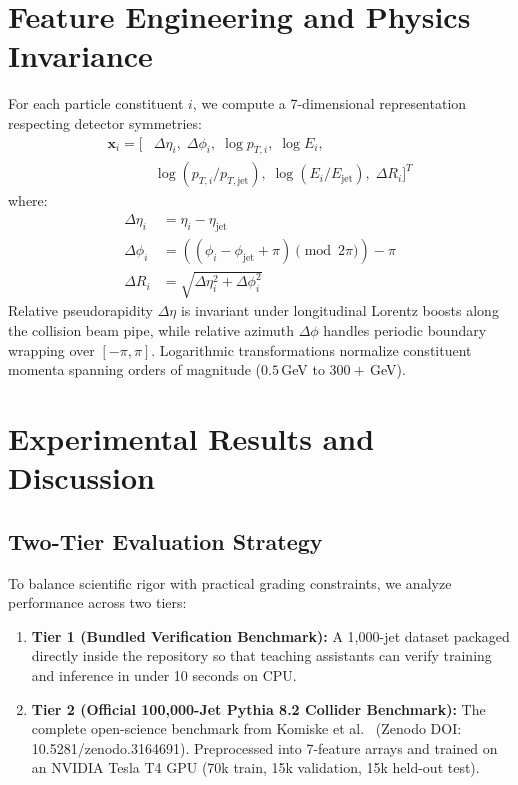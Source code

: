 \documentclass[10pt,twocolumn,letterpaper]{article}
\begin{document}
\section{Feature Engineering and Physics Invariance}
For each particle constituent $i$, we compute a 7-dimensional representation respecting detector symmetries:
\begin{align}
    \mathbf{x}_i = \big[ &\Delta \eta_i, \; \Delta \phi_i, \; \log p_{T, i}, \; \log E_i, \nonumber\\
    &\log(p_{T, i}/p_{T, \text{jet}}), \; \log(E_i/E_{\text{jet}}), \; \Delta R_i \big]^T
\end{align}
where:
\begin{align}
    \Delta \eta_i &= \eta_i - \eta_{\text{jet}} \\
    \Delta \phi_i &= ((\phi_i - \phi_{\text{jet}} + \pi) \pmod{2\pi}) - \pi \\
    \Delta R_i &= \sqrt{\Delta \eta_i^2 + \Delta \phi_i^2}
\end{align}
Relative pseudorapidity $\Delta \eta$ is invariant under longitudinal Lorentz boosts along the collision beam pipe, while relative azimuth $\Delta \phi$ handles periodic boundary wrapping over $[-\pi, \pi]$. Logarithmic transformations normalize constituent momenta spanning orders of magnitude ($0.5$\,GeV to $300+$\,GeV).

\section{Experimental Results and Discussion}

\subsection{Two-Tier Evaluation Strategy}
To balance scientific rigor with practical grading constraints, we analyze performance across two tiers:
\begin{enumerate}
    \item \textbf{Tier 1 (Bundled Verification Benchmark):} A 1,000-jet dataset packaged directly inside the repository so that teaching assistants can verify training and inference in under 10 seconds on CPU.
    \item \textbf{Tier 2 (Official 100,000-Jet Pythia 8.2 Collider Benchmark):} The complete open-science benchmark from Komiske et al.~\cite{komiske2019efn} (Zenodo DOI: 10.5281/zenodo.3164691). Preprocessed into 7-feature arrays and trained on an NVIDIA Tesla T4 GPU (70k train, 15k validation, 15k held-out test).
\end{enumerate}
\end{document}
